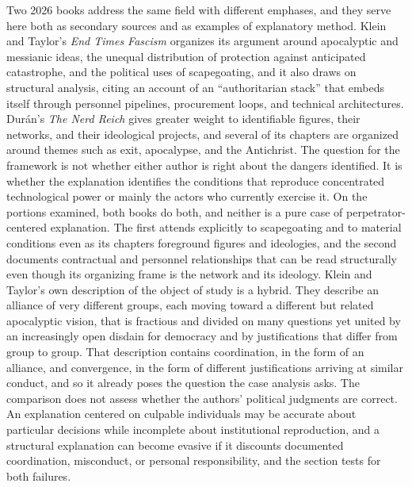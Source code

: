 \documentclass[12pt]{article}
\theoremstyle{remark}
\begin{document}
Two 2026 books address the same field with different emphases, and they serve here both as secondary sources and as examples of explanatory method. Klein and Taylor's \emph{End Times Fascism} \cite{klein2026} organizes its argument around apocalyptic and messianic ideas, the unequal distribution of protection against anticipated catastrophe, and the political uses of scapegoating, and it also draws on structural analysis, citing an account of an ``authoritarian stack'' that embeds itself through personnel pipelines, procurement loops, and technical architectures. Durán's \emph{The Nerd Reich} \cite{duran2026} gives greater weight to identifiable figures, their networks, and their ideological projects, and several of its chapters are organized around themes such as exit, apocalypse, and the Antichrist. The question for the framework is not whether either author is right about the dangers identified. It is whether the explanation identifies the conditions that reproduce concentrated technological power or mainly the actors who currently exercise it. On the portions examined, both books do both, and neither is a pure case of perpetrator-centered explanation. The first attends explicitly to scapegoating and to material conditions even as its chapters foreground figures and ideologies, and the second documents contractual and personnel relationships that can be read structurally even though its organizing frame is the network and its ideology. Klein and Taylor's own description of the object of study is a hybrid. They describe an alliance of very different groups, each moving toward a different but related apocalyptic vision, that is fractious and divided on many questions yet united by an increasingly open disdain for democracy and by justifications that differ from group to group. That description contains coordination, in the form of an alliance, and convergence, in the form of different justifications arriving at similar conduct, and so it already poses the question the case analysis asks. The comparison does not assess whether the authors' political judgments are correct. An explanation centered on culpable individuals may be accurate about particular decisions while incomplete about institutional reproduction, and a structural explanation can become evasive if it discounts documented coordination, misconduct, or personal responsibility, and the section tests for both failures.
\end{document}
